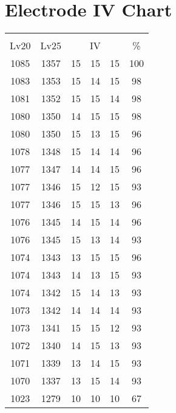 \documentclass{article}%
\begin{document}
%
\normalsize%
\section{Electrode IV Chart}%
\label{sec:Electrode IV Chart}%
\renewcommand{\arraystretch}{1.5}%
\begin{tabular}{|c|c|c|c|c|c|}%
\hline%
\multicolumn{6}{|c|}{\textcolor{white}{ 
\linebreak{Electrode}
}%
\cellcolor{black}}\\%
\multicolumn{1}{|c}{Lv20}&\multicolumn{1}{c|}{Lv25}&\multicolumn{3}{c|}{IV}&\multicolumn{1}{|c|}{\%}\\%
\hline%
\rowcolor{color100}%
1085&1357&15&15&15&100\\%
\hline%
\rowcolor{color98}%
1083&1353&15&14&15&98\\%
\hline%
\rowcolor{color98}%
1081&1352&15&15&14&98\\%
\hline%
\rowcolor{color98}%
1080&1350&14&15&15&98\\%
\hline%
\rowcolor{color96}%
1080&1350&15&13&15&96\\%
\hline%
\rowcolor{color96}%
1078&1348&15&14&14&96\\%
\hline%
\rowcolor{color96}%
1077&1347&14&14&15&96\\%
\hline%
\rowcolor{color93}%
1077&1346&15&12&15&93\\%
\hline%
\rowcolor{color96}%
1077&1346&15&15&13&96\\%
\hline%
\rowcolor{color96}%
1076&1345&14&15&14&96\\%
\hline%
\rowcolor{color93}%
1076&1345&15&13&14&93\\%
\hline%
\rowcolor{color96}%
1074&1343&13&15&15&96\\%
\hline%
\rowcolor{color93}%
1074&1343&14&13&15&93\\%
\hline%
\rowcolor{color93}%
1074&1342&15&14&13&93\\%
\hline%
\rowcolor{color93}%
1073&1342&14&14&14&93\\%
\hline%
\rowcolor{color93}%
1073&1341&15&15&12&93\\%
\hline%
\rowcolor{color93}%
1072&1340&14&15&13&93\\%
\hline%
\rowcolor{color93}%
1071&1339&13&14&15&93\\%
\hline%
\rowcolor{color93}%
1070&1337&13&15&14&93\\%
\hline%
\rowcolor{color91}%
1023&1279&10&10&10&67\\%
\end{tabular}

%
\end{document}
